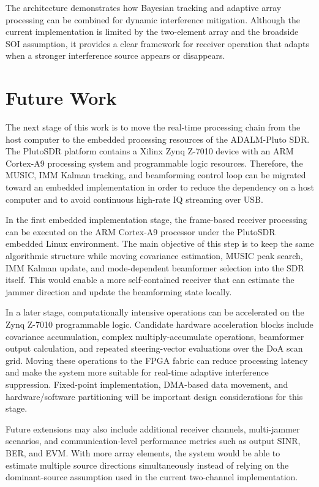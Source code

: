 \documentclass[conference]{IEEEtran}
\begin{document}
The architecture demonstrates how Bayesian tracking and adaptive array processing can be combined for dynamic interference mitigation. Although the current implementation is limited by the two-element array and the broadside SOI assumption, it provides a clear framework for receiver operation that adapts when a stronger interference source appears or disappears.


\section{Future Work}
The next stage of this work is to move the real-time processing chain from the host computer to the embedded processing resources of the ADALM-Pluto SDR. The PlutoSDR platform contains a Xilinx Zynq Z-7010 device with an ARM Cortex-A9 processing system and programmable logic resources. Therefore, the MUSIC, IMM Kalman tracking, and beamforming control loop can be migrated toward an embedded implementation in order to reduce the dependency on a host computer and to avoid continuous high-rate IQ streaming over USB.

In the first embedded implementation stage, the frame-based receiver processing can be executed on the ARM Cortex-A9 processor under the PlutoSDR embedded Linux environment. The main objective of this step is to keep the same algorithmic structure while moving covariance estimation, MUSIC peak search, IMM Kalman update, and mode-dependent beamformer selection into the SDR itself. This would enable a more self-contained receiver that can estimate the jammer direction and update the beamforming state locally.

In a later stage, computationally intensive operations can be accelerated on the Zynq Z-7010 programmable logic. Candidate hardware acceleration blocks include covariance accumulation, complex multiply-accumulate operations, beamformer output calculation, and repeated steering-vector evaluations over the DoA scan grid. Moving these operations to the FPGA fabric can reduce processing latency and make the system more suitable for real-time adaptive interference suppression. Fixed-point implementation, DMA-based data movement, and hardware/software partitioning will be important design considerations for this stage.

Future extensions may also include additional receiver channels, multi-jammer scenarios, and communication-level performance metrics such as output SINR, BER, and EVM. With more array elements, the system would be able to estimate multiple source directions simultaneously instead of relying on the dominant-source assumption used in the current two-channel implementation.
\end{document}
